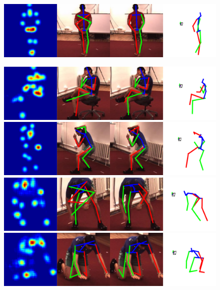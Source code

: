 \begin{figure}
\begin{minipage}{0.49\textwidth}
  \includegraphics[width=\linewidth]{figures/examples/h36m/S9-7.pdf}\vspace{0.3em}
  \end{minipage}
  \begin{minipage}{0.49\textwidth}
  \includegraphics[width=\linewidth]{figures/examples/h36m/S11-2.pdf}\vspace{0.3em}
  \includegraphics[width=\linewidth]{figures/examples/h36m/S11-3.pdf}\vspace{0.3em}
  \includegraphics[width=\linewidth]{figures/examples/h36m/S11-4.pdf}\vspace{0.3em}
  \includegraphics[width=\linewidth]{figures/examples/h36m/S11-5.pdf}\vspace{0.3em}

\end{minipage}
\end{figure}
